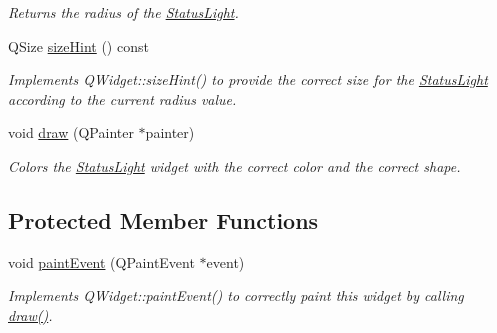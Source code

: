 \begin{DoxyCompactItemize}
\begin{DoxyCompactList}\small\item\em Returns the radius of the \hyperlink{class_status_light}{Status\-Light}. \end{DoxyCompactList}\item 
\hypertarget{class_status_light_ad5abf52d521cc7fcb3a4f48b0f668901}{Q\-Size \hyperlink{class_status_light_ad5abf52d521cc7fcb3a4f48b0f668901}{size\-Hint} () const }\label{class_status_light_ad5abf52d521cc7fcb3a4f48b0f668901}

\begin{DoxyCompactList}\small\item\em Implements Q\-Widget\-::size\-Hint() to provide the correct size for the \hyperlink{class_status_light}{Status\-Light} according to the current radius value. \end{DoxyCompactList}\item 
\hypertarget{class_status_light_a8732663a4f376410f8682469f8571f1e}{void \hyperlink{class_status_light_a8732663a4f376410f8682469f8571f1e}{draw} (Q\-Painter $\ast$painter)}\label{class_status_light_a8732663a4f376410f8682469f8571f1e}

\begin{DoxyCompactList}\small\item\em Colors the \hyperlink{class_status_light}{Status\-Light} widget with the correct color and the correct shape. \end{DoxyCompactList}\end{DoxyCompactItemize}
\subsection*{Protected Member Functions}
\begin{DoxyCompactItemize}
\item 
\hypertarget{class_status_light_a77c894c226de02c7a8b6faa6fb2c6801}{void \hyperlink{class_status_light_a77c894c226de02c7a8b6faa6fb2c6801}{paint\-Event} (Q\-Paint\-Event $\ast$event)}\label{class_status_light_a77c894c226de02c7a8b6faa6fb2c6801}

\begin{DoxyCompactList}\small\item\em Implements Q\-Widget\-::paint\-Event() to correctly paint this widget by calling \hyperlink{class_status_light_a8732663a4f376410f8682469f8571f1e}{draw()}. \end{DoxyCompactList}\end{DoxyCompactItemize}


